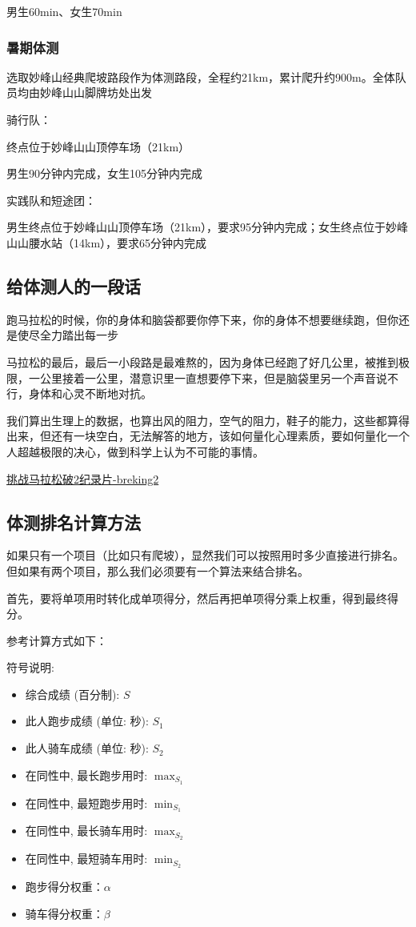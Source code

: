 \documentclass{ctexbook}
\begin{document}
男生60min、女生70min
\subsubsection{暑期体测}
选取妙峰山经典爬坡路段作为体测路段，全程约21km，累计爬升约900m。全体队员均由妙峰山山脚牌坊处出发

骑行队：

终点位于妙峰山山顶停车场（21km）

男生90分钟内完成，女生105分钟内完成

实践队和短途团：

男生终点位于妙峰山山顶停车场（21km），要求95分钟内完成；女生终点位于妙峰山山腰水站（14km），要求65分钟内完成
\subsection{给体测人的一段话}
跑马拉松的时候，你的身体和脑袋都要你停下来，你的身体不想要继续跑，但你还是使尽全力踏出每一步

马拉松的最后，最后一小段路是最难熬的，因为身体已经跑了好几公里，被推到极限，一公里接着一公里，潜意识里一直想要停下来，但是脑袋里另一个声音说不行，身体和心灵不断地对抗。

我们算出生理上的数据，也算出风的阻力，空气的阻力，鞋子的能力，这些都算得出来，但还有一块空白，无法解答的地方，该如何量化心理素质，要如何量化一个人超越极限的决心，做到科学上认为不可能的事情。

\href{https://www.bilibili.com/video/BV1pb411K74L}{挑战马拉松破2纪录片-breking2}
\subsection{体测排名计算方法}
如果只有一个项目（比如只有爬坡），显然我们可以按照用时多少直接进行排名。但如果有两个项目，那么我们必须要有一个算法来结合排名。

首先，要将单项用时转化成单项得分，然后再把单项得分乘上权重，得到最终得分。

参考计算方式如下：

符号说明:

\begin{itemize}
    \item 综合成绩 (百分制):  $S$ 
    \item 此人跑步成绩 (单位: 秒):  $S_{1}$ 
    \item 此人骑车成绩 (单位: 秒):  $S_{2}$ 
    \item 在同性中, 最长跑步用时:  $\max _{S_{1}}$ 
    \item 在同性中, 最短跑步用时:  $\min _{S_{1}}$ 
    \item 在同性中, 最长骑车用时:  $\max _{S_{2}}$ 
    \item 在同性中, 最短骑车用时:  $\min _{S_{2}}$ 
    \item 跑步得分权重：$\alpha$
    \item 骑车得分权重：$\beta$
\end{itemize}
\end{document}
